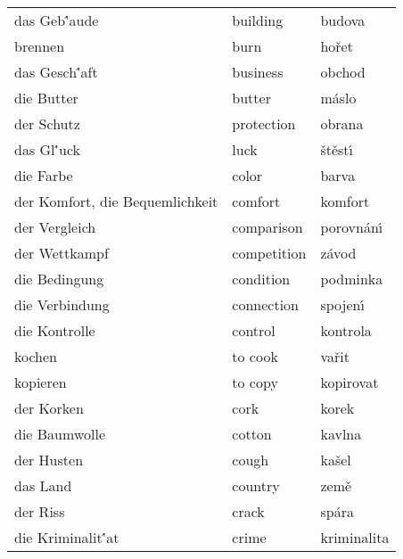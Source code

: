 \documentclass[11pt]{article}
\begin{document}
\begin{longtable}{lll}
 das Geb\''aude                   &  building                 &  budova              \\
 brennen                          &  burn                     &  ho\v ret            \\
 das Gesch\''aft                  &  business                 &  obchod              \\
 die Butter                       &  butter                   &  m\'aslo             \\
 der Schutz                       &  protection               &  obrana              \\
 das Gl\''uck                     &  luck                     &  \v st\v est\'\i     \\
 die Farbe                        &  color                    &  barva               \\
 der Komfort, die Bequemlichkeit  &  comfort                  &  komfort             \\
 der Vergleich                    &  comparison               &  porovn\'an\'\i      \\
 der Wettkampf                    &  competition              &  z\'avod             \\
 die Bedingung                    &  condition                &  podminka            \\
 die Verbindung                   &  connection               &  spojen\'\i          \\
 die Kontrolle                    &  control                  &  kontrola            \\
 kochen                           &  to cook                  &  va\v rit            \\
 kopieren                         &  to copy                  &  kopirovat           \\
 der Korken                       &  cork                     &  korek               \\
 die Baumwolle                    &  cotton                   &  kavlna              \\
 der Husten                       &  cough                    &  ka\v sel            \\
 das Land                         &  country                  &  zem\v e             \\
 der Riss                         &  crack                    &  sp\'ara             \\
 die Kriminalit\''at              &  crime                    &  kriminalita         \\

\end{longtable}
\end{document}
